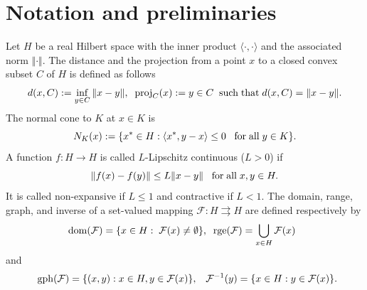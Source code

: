 \documentclass[11pt]{article}
\def\beq{\begin{equation}}
\def\eeq{\end{equation}}
\theoremstyle{plain}
\begin{document}
\section{Notation and preliminaries} \label{sec2}
Let  $H$  be  a {real} Hilbert space  with {the inner product $\langle \cdot,\cdot \rangle$ and the associated norm $\Vert \cdot \Vert$.}  The distance and the projection from a point $x$ to a closed convex subset $C$ of $H$ is defined as follows
$${ d}(x,C):=\inf_{y\in C} \|x-y\|, \;\;{\rm proj}_C(x):={y \in C \;\;{\rm such \;that \;} { d}(x,C)= \|x-y\|}.$$
The normal cone  to  $K$ at $x\in K$ is 
\beq
N_K(x):=\{x^*\in H: \langle x^*, y-x \rangle\le 0\;\;{\rm \;for\;all}\;y\in K\}.
\eeq
  A  function  $f: H\to H$ is called $L$-Lipschitz continuous ($L>0$) if
\beq
\Vert f(x)-f(y)\Vert \le L \Vert x-y \Vert\;\;{\rm \;for\;all}\;x, y\in H.
\eeq
It is called non-expansive if  $L\le 1$  and contractive if $L<1$.  
\noindent The domain, range, graph, and inverse of a set-valued mapping $\mathcal{F}: {H}\rightrightarrows {H}$ are defined respectively by
$${\rm dom}(\mathcal{F})=\{x\in {H}:\;\mathcal{F}(x)\neq \emptyset\},\;\;{\rm rge}(\mathcal{F})=\displaystyle\bigcup_{x\in{H}}\mathcal{F}(x)\;\;$$
 and
 $$\;\;{\rm gph}(\mathcal{F})=\{(x,y): x\in{H}, y\in \mathcal{F}(x)\},\;\;\;\mathcal{F}^{-1}(y)=\{ x\in H: y\in \mathcal{F}(x) \}.$$
\end{document}
